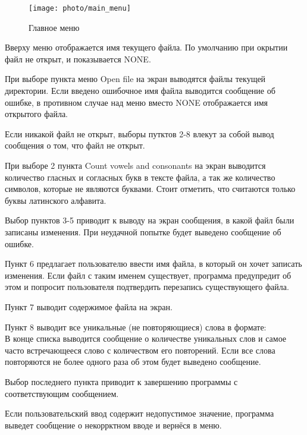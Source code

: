\documentclass[12pt,a4paper]{article}%
\begin{document}
\begin{figure}[h!]
	\centering
	\texttt{[image: photo/main\_menu]}
	\caption{Главное меню}
	\label{main_menu}
\end{figure}

Вверху меню отображается имя текущего файла. По умолчанию при окрытии файл не открыт, и показывается NONE.

При выборе пункта меню Open file на экран выводятся файлы текущей директории. Если введено ошибочное имя файла выводится сообщение об ошибке, в противном случае над меню вместо NONE отображается имя открытого файла.

Если никакой файл не открыт, выборы путктов 2-8 влекут за собой вывод сообщения о том, что файл не открыт.

При выборе 2 пункта Count vowels and consonants на экран выводится количество гласных и согласных букв в тексте файла, а так же количество символов, которые не являются буквами. Стоит отметить, что считаются только буквы латинского алфавита.

Выбор пунктов 3-5 приводит к выводу на экран сообщения, в какой файл были записаны изменения. При неудачной попытке будет выведено сообщение об ошибке.

Пункт 6 предлагает пользователю ввести имя файла, в который он хочет записать изменения. Если файл с таким именем существует, программа предупредит об этом и попросит пользователя подтвердить перезапись существующего файла.

Пункт 7 выводит содержимое файла на экран.

Пункт 8 выводит все уникальные (не повторяющиеся) слова в формате:\\
В конце списка выводится сообщение о количестве уникальных слов и самое часто встречающееся слово с количеством его повторений. Если все слова повторяются не более одного раза об этом будет выведено сообщение.

Выбор последнего пункта приводит к завершению программы с соответствующим сообщением.

Если пользовательский ввод содержит недопустимое значение, программа выведет сообщение о некоррктном вводе и вернёся в меню.
\newpage
\end{document}
